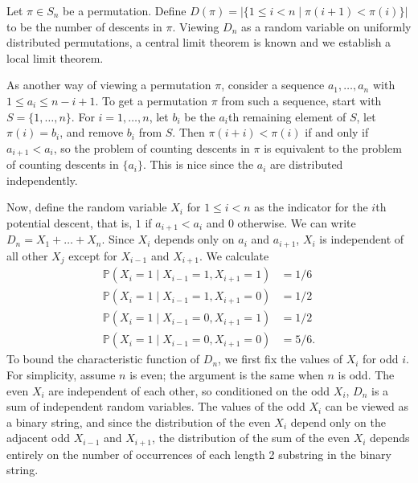 \documentclass{article}
\newcommand{\abs}[1]{\left\lvert#1\right\rvert}
\renewcommand{\P}{\mathbb{P}}
\begin{document}
	Let $\pi \in S_n$ be a permutation. Define $D(\pi) = \abs{\{1 \leq i < n \mid \pi(i + 1) < \pi(i)\}}$ to be the number of descents in $\pi$. Viewing $D_n$ as a random variable on uniformly distributed permutations, a central limit theorem is known and we establish a local limit theorem.

	As another way of viewing a permutation $\pi$, consider a sequence $a_1, \ldots, a_n$ with $1 \leq a_i \leq n - i + 1$. To get a permutation $\pi$ from such a sequence, start with $S = \{1, \ldots, n\}$. For $i = 1, \ldots, n$, let $b_i$ be the $a_i$th remaining element of $S$, let $\pi(i) = b_i$, and remove $b_i$ from $S$. Then $\pi(i + i) < \pi(i)$ if and only if $a_{i+1} < a_i$, so the problem of counting descents in $\pi$ is equivalent to the problem of counting descents in $\{a_i\}$. This is nice since the $a_i$ are distributed independently.

	Now, define the random variable $X_i$ for $1 \leq i < n$ as the indicator for the $i$th potential descent, that is, $1$ if $a_{i+1} < a_i$ and $0$ otherwise. We can write $D_n = X_1 + \ldots + X_n$. Since $X_i$ depends only on $a_i$ and $a_{i+1}$, $X_i$ is independent of all other $X_j$ except for $X_{i-1}$ and $X_{i+1}$. We calculate
	\begin{align*}
		\P(X_i = 1 \mid X_{i-1} = 1, X_{i+1} = 1) &= 1/6 \\
		\P(X_i = 1 \mid X_{i-1} = 1, X_{i+1} = 0) &= 1/2 \\
		\P(X_i = 1 \mid X_{i-1} = 0, X_{i+1} = 1) &= 1/2 \\
		\P(X_i = 1 \mid X_{i-1} = 0, X_{i+1} = 0) &= 5/6.
	\end{align*}
	To bound the characteristic function of $D_n$, we first fix the values of $X_i$ for odd $i$. For simplicity, assume $n$ is even; the argument is the same when $n$ is odd. The even $X_i$ are independent of each other, so conditioned on the odd $X_i$, $D_n$ is a sum of independent random variables. The values of the odd $X_i$ can be viewed as a binary string, and since the distribution of the even $X_i$ depend only on the adjacent odd $X_{i-1}$ and $X_{i+1}$, the distribution of the sum of the even $X_i$ depends entirely on the number of occurrences of each length 2 substring in the binary string.
\end{document}

